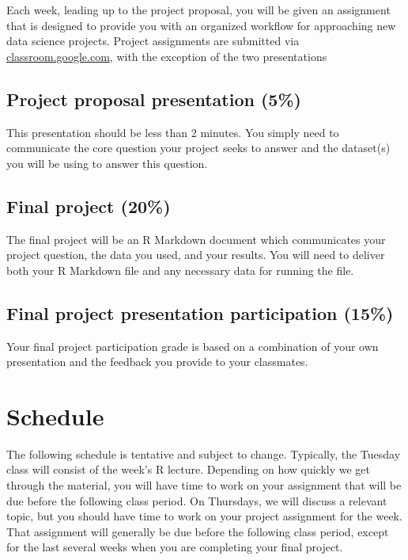 \documentclass[]{book}
\theoremstyle{definition}
\theoremstyle{definition}
\theoremstyle{remark}
\begin{document}
Each week, leading up to the project proposal, you will be given an
assignment that is designed to provide you with an organized workflow
for approaching new data science projects. Project assignments are
submitted via \href{https//classroom.google.com}{classroom.google.com},
with the exception of the two presentations

\subsection*{Project proposal presentation
(5\%)}\label{project-proposal-presentation-5}

This presentation should be less than 2 minutes. You simply need to
communicate the core question your project seeks to answer and the
dataset(s) you will be using to answer this question.

\subsection*{Final project (20\%)}\label{final-project-20}

The final project will be an R Markdown document which communicates your
project question, the data you used, and your results. You will need to
deliver both your R Markdown file and any necessary data for running the
file.

\subsection*{Final project presentation participation
(15\%)}\label{final-project-presentation-participation-15}

Your final project participation grade is based on a combination of your
own presentation and the feedback you provide to your classmates.

\section*{Schedule}\label{schedule}

The following schedule is tentative and subject to change. Typically,
the Tuesday class will consist of the week's R lecture. Depending on how
quickly we get through the material, you will have time to work on your
assignment that will be due before the following class period. On
Thursdays, we will discuss a relevant topic, but you should have time to
work on your project assignment for the week. That assignment will
generally be due before the following class period, except for the last
several weeks when you are completing your final project.
\end{document}
